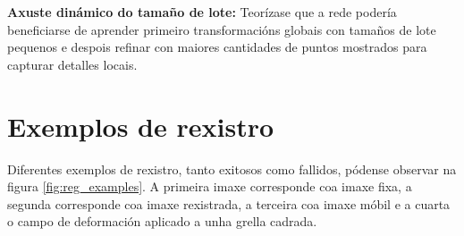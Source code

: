 \textbf{Axuste dinámico do tamaño de lote:} Teorízase que a rede podería beneficiarse de aprender primeiro transformacións globais con tamaños de lote pequenos e despois refinar con maiores cantidades de puntos mostrados para capturar detalles locais.



\section{Exemplos de rexistro}
\label{sec:Exemplos de rexistro}

Diferentes exemplos de rexistro, tanto exitosos como fallidos, pódense observar na figura \ref{fig:reg_examples}.
A primeira imaxe corresponde coa imaxe fixa, a segunda corresponde coa imaxe rexistrada, a terceira coa imaxe móbil e a cuarta o campo de deformación aplicado a unha grella cadrada.
 
